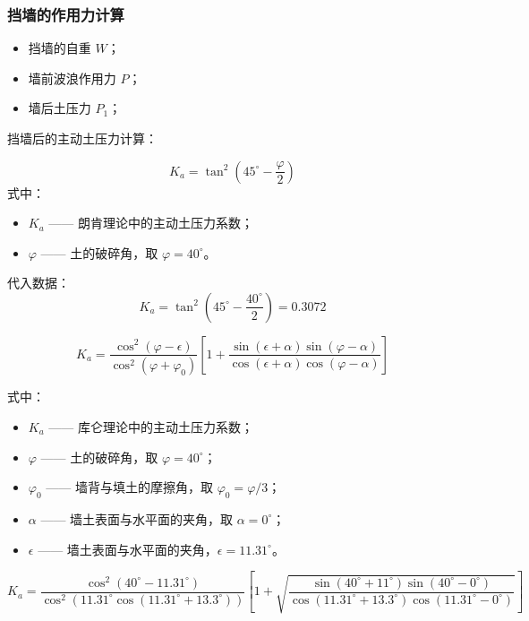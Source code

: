 \documentclass[UTF8, a4paper, 12pt]{ctexart} %
\begin{document}
\subsubsection{挡墙的作用力计算}
\begin{itemize}
    \item 挡墙的自重 $W$；
\end{itemize}
\begin{itemize}
    \item 墙前波浪作用力 $P$；
\end{itemize}
\begin{itemize}
    \item 墙后土压力 $P_1$；
\end{itemize}

挡墙后的主动土压力计算：

\begin{equation}
K_a = \tan^2 \left( 45^\circ - \frac{\varphi}{2} \right) 
\end{equation}
式中：
\begin{itemize}
    \item $K_a$ —— 朗肯理论中的主动土压力系数；
    \item $\varphi$ —— 土的破碎角，取 $\varphi = 40^\circ$。
\end{itemize}

代入数据：
\[
K_a = \tan^2 \left( 45^\circ - \frac{40^\circ}{2} \right) = 0.3072
\]

\[
K_a = \frac{\cos^2 (\varphi - \epsilon)}{\cos^2 (\varphi + \varphi_0)} \left[ 1 + \frac{\sin (\epsilon + \alpha) \sin (\varphi - \alpha)}{\cos (\epsilon + \alpha) \cos (\varphi - \alpha)} \right]
\]

式中：
\begin{itemize}
    \item $K_a$ —— 库仑理论中的主动土压力系数；
    \item $\varphi$ —— 土的破碎角，取 $\varphi = 40^\circ$；
    \item $\varphi_0$ —— 墙背与填土的摩擦角，取 $\varphi_0 = \varphi / 3$；
    \item $\alpha$ —— 墙土表面与水平面的夹角，取 $\alpha = 0^\circ$；
    \item $\epsilon$ —— 墙土表面与水平面的夹角，$\epsilon = 11.31^\circ$。
\end{itemize}

\[
K_a = \frac{\cos^2 \left( 40^\circ - 11.31^\circ \right)}{\cos^2 \left( 11.31^\circ \cos \left( 11.31^\circ + 13.3^\circ \right) \right)} 
\left[ 
1 + \sqrt{\frac{\sin \left( 40^\circ + 11^\circ \right) \sin \left( 40^\circ - 0^\circ \right)}{\cos \left( 11.31^\circ + 13.3^\circ \right) \cos \left( 11.31^\circ - 0^\circ \right)}}
\right]
\]
\end{document}
